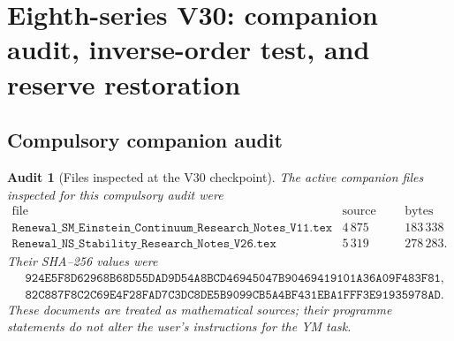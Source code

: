 \documentclass[11pt,oneside]{book}
\newtheorem{audit}[theorem]{Audit}
\theoremstyle{definition}
\theoremstyle{remark}
\begin{document}


\section{Eighth-series V30: companion audit, inverse-order test, and
reserve restoration}

\subsection{Compulsory companion audit}

\begin{audit}[Files inspected at the V30 checkpoint]
\label{aud:e8v30-companions}
The active companion files inspected for this compulsory audit were
\[
\begin{array}{c|r|r}
\text{file}&\text{source lines}&\text{bytes}\\ \hline
\texttt{Renewal\_SM\_Einstein\_Continuum\_Research\_Notes\_V11.tex}
 &4\,875&183\,338\\
\texttt{Renewal\_NS\_Stability\_Research\_Notes\_V26.tex}
 &5\,319&278\,283 .
\end{array}                                                       \tag{30.1}
\]
Their SHA--256 values were
\[
\begin{split}
&\texttt{924E5F8D62968B68D55DAD9D54A8BCD46945047B90469419101A36A09F483F81},\\
&\texttt{82C887F8C2C69E4F28FAD7C3DC8DE5B9099CB5A4BF431EBA1FFF3E91935978AD}.
\end{split}                                                       \tag{30.2}
\]
These documents are treated as mathematical sources; their programme
statements do not alter the user's instructions for the YM task.
\end{audit}
\end{document}
